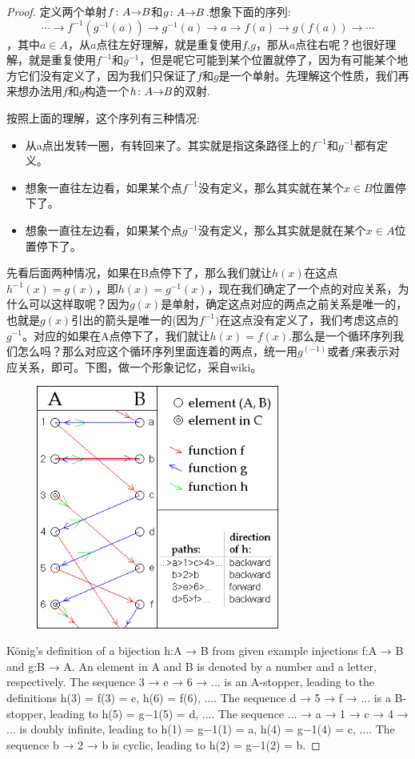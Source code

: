 \begin{proof}
定义两个单射${f}\colon{A}{\to}{B}$和${g}\colon{A}{\to}{B}$.想象下面的序列:\[\cdots \rightarrow  f^{-1}(g^{-1}(a)) \rightarrow g^{-1}(a) \rightarrow   a  \rightarrow  f(a) \rightarrow  g(f(a)) \rightarrow \cdots\]，其中$a \in A$，从$a$点往左好理解，就是重复使用$f$,$g$，那从$a$点往右呢？也很好理解，就是重复使用$f^{-1}$和$g^{-1}$，但是呢它可能到某个位置就停了，因为有可能某个地方它们没有定义了，因为我们只保证了$f$和$g$是一个单射。先理解这个性质，我们再来想办法用$f$和$g$构造一个${h}\colon{A}{\to}{B}$的双射.

按照上面的理解，这个序列有三种情况:
\begin{itemize}
	\item 从a点出发转一圈，有转回来了。其实就是指这条路径上的$f^{-1}$和$g^{-1}$都有定义。
	\item 想象一直往左边看，如果某个点$f^{-1}$没有定义，那么其实就在某个$x \in B$位置停下了。
	\item 想象一直往左边看，如果某个点$g^{-1}$没有定义，那么其实就是就在某个$x \in A$位置停下了。	
\end{itemize}

先看后面两种情况，如果在B点停下了，那么我们就让$h(x)$在这点$h^{-1}(x)=g(x)$，即$h(x)=g^{-1}(x)$，现在我们确定了一个点的对应关系，为什么可以这样取呢？因为$g(x)$是单射，确定这点对应的两点之前关系是唯一的，也就是$g(x)$引出的箭头是唯一的(因为$f^{-1})$在这点没有定义了，我们考虑这点的$g^{-1}$。对应的如果在A点停下了，我们就让$h(x)=f(x)$.那么是一个循环序列我们怎么吗？那么对应这个循环序列里面连着的两点，统一用$g^(-1)$或者$f$来表示对应关系，即可。下图，做一个形象记忆，采自wiki。

\begin{center}
\includegraphics[width=10cm, height=8cm]{images/Cantor-Bernstein.png}
\end{center}

König's definition of a bijection h:A → B from given example injections f:A → B and g:B → A. An element in A and B is denoted by a number and a letter, respectively. The sequence 3 → e → 6 → ... is an A-stopper, leading to the definitions h(3) = f(3) = e, h(6) = f(6), .... The sequence d → 5 → f → ... is a B-stopper, leading to h(5) = g−1(5) = d, .... The sequence ... → a → 1 → c → 4 → ... is doubly infinite, leading to h(1) = g−1(1) = a, h(4) = g−1(4) = c, .... The sequence b → 2 → b is cyclic, leading to h(2) = g−1(2) = b.

\end{proof}


